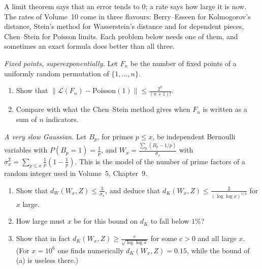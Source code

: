 A limit theorem says that an error tends to $0$; a rate says how large it is now. The rates of Volume~10 come in three flavours: Berry--Esseen for
Kolmogorov's distance, Stein's method for Wasserstein's distance and for dependent pieces, Chen--Stein for Poisson limits. Each problem below needs one
of them, and sometimes an exact formula does better than all three.

\begin{exercise}[$\star$]\label{pb:fixedtv}
\emph{Fixed points, superexponentially.} Let $F_n$ be the number of fixed points of a uniformly random permutation of $\{1,\dots,n\}$.
\begin{enumerate}[label=(\alph*)]
\item Show that $\bigl\|\mathcal L(F_n)-\text{Poisson}(1)\bigr\|\le\frac{2^n}{(n+1)!}$.
\item Compare with what the Chen--Stein method gives when $F_n$ is written as a sum of $n$ indicators.
\end{enumerate}
\end{exercise}

\begin{exercise}[$\star$]\label{pb:kubslow}
\emph{A very slow Gaussian.} Let $B_p$, for primes $p\le x$, be independent Bernoulli variables with $P(B_p=1)=\frac1p$, and $W_x=\frac{\sum_p(B_p-1/p)}{\sigma_x}$ with
$\sigma_x^2=\sum_{p\le x}\frac1p(1-\frac1p)$. This is the model of the number of prime factors of a random integer used in Volume~5, Chapter~9.
\begin{enumerate}[label=(\alph*)]
\item Show that $d_W(W_x,Z)\le\frac3{\sigma_x}$, and deduce that $d_K(W_x,Z)\le\frac{2}{(\log\log x)^{1/4}}$ for $x$ large.
\item How large must $x$ be for this bound on $d_K$ to fall below $1\%$?
\item Show that in fact $d_K(W_x,Z)\ge\frac c{\sqrt{\log\log x}}$ for some $c>0$ and all large $x$. (For $x=10^6$ one finds numerically $d_K(W_x,Z)=0.15$, while the bound of (a) is useless there.)
\end{enumerate}
\end{exercise}

